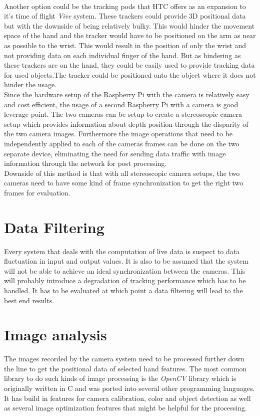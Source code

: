 \\Another option could be the tracking  pods that HTC offers as an expansion to it's time of flight \textit{Vive} system. These trackers could provide 3D positional data but with the downside of being relatively bulky. This would hinder the movement space of the hand and the tracker would have to be positioned on the arm as near as possible to the wrist. This would result in the position of only the wrist and not providing data on each individual finger of the hand. But as hindering as these trackers are on the hand, they could be easily used to provide tracking data for used objects.The tracker could be positioned onto the object where it does not hinder the usage. \\
Since the hardware setup of the Raspberry Pi with the camera is relatively easy and cost efficient, the usage of a second Raspberry Pi with a camera is good leverage point. The two cameras can be setup to create a stereoscopic camera setup which provides information about depth position through the disparity of the two camera images. 
Furthermore the image operations that need to be independently applied to each of the cameras frames can be done on the two separate device, eliminating the need for sending data traffic with image information through the network for post processing.
\\Downside of this method is that with all stereoscopic camera setups, the two cameras need to have some kind of frame synchronization to get the right two frames for evaluation.
\section{Data Filtering}
Every system that deals with the computation of live data is suspect to data fluctuation in input and output values. It is also to be assumed that the system will not be able to achieve an ideal synchronization between the cameras. This will probably introduce a degradation of tracking performance which has to be handled. It has to be evaluated at which point a data filtering will lead to the best end results.
\section{Image analysis}
The images recorded by the camera system need to be processed further down the line to get the positional data of selected hand features. The most common library to do such kinds of image processing is the \textit{OpenCV}\cite{OpenCVTeam.2018} library which is originally written in C and was ported into several other programming languages. It has build in features for camera calibration, color and object detection as well as several image optimization features that might be helpful for the processing.
